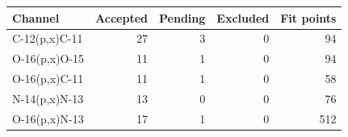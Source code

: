 \begin{tabular}{lrrrr}
\toprule
Channel & Accepted & Pending & Excluded & Fit points \\
\midrule
C-12(p,x)C-11 & 27 & 3 & 0 & 94 \\
O-16(p,x)O-15 & 11 & 1 & 0 & 94 \\
O-16(p,x)C-11 & 11 & 1 & 0 & 58 \\
N-14(p,x)N-13 & 13 & 0 & 0 & 76 \\
O-16(p,x)N-13 & 17 & 1 & 0 & 512 \\
\bottomrule
\end{tabular}
